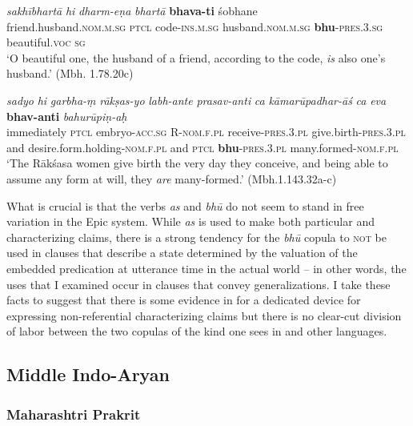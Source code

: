 \documentclass[output=paper,hidelinks]{langscibook}
\begin{document}
\begin{exe}
\begin{xlist}
\begin{xlist}
\begin{exe}
\begin{exe}
\begin{exe}
\begin{exe}
\begin{xlist}
\begin{exe}
\begin{xlist}
\ea
\label{bhu1}
\ea
\gll \emph{sakhībhartā} \emph{hi} \emph{dharm-eṇa} \emph{bhartā} \textbf{bhava-ti} {\'{s}obhane}\\
 friend.husband.\textsc{nom.m.sg} \textsc{ptcl} code-\textsc{ins.m.sg} husband.\textsc{nom.m.sg} \textbf{bhu}-\textsc{pres.3.sg} beautiful.\textsc{voc sg}\\
\glt `O beautiful one, the husband of a friend, according to the code, \emph{is} also one's husband.' (Mbh. 1.78.20c) \label{husband}

\ex
\gll \emph{sadyo} \emph{hi} \emph{garbha-\d{m}} \emph{rāk\d{s}as-yo} \emph{labh-ante} \emph{prasav-anti} \emph{ca}
 \emph{kāmar\={u}padhar-ā\'{s}} \emph{ca} \emph{eva} \textbf{bhav-anti} \emph{bahur\={u}piṇ-a\d{h}}\\
immediately \textsc{ptcl} embryo-\textsc{acc.sg} R-\textsc{nom.f.pl} receive-\textsc{pres.3.pl} give.birth-\textsc{pres.3.pl} and desire.form.holding-\textsc{nom.f.pl} and \textsc{ptcl} \textbf{bhu}-\textsc{pres.3.pl} many.formed-\textsc{nom.f.pl}\\
\glt `The Rāk\'{s}asa women give birth the very day they conceive, and being able to assume any form at will, they \emph{are} many-formed.' (Mbh.1.143.32a-c) \label{demon}
\z
\z

What is crucial is that the verbs \emph{as} and \emph{bh\={u}} do not seem to stand in free variation in the Epic  system. While \emph{as} is used to make both particular and characterizing claims, there is a strong tendency for the \emph{bh\={u}} copula to \textsc{not} be used in clauses that describe a state determined by the valuation of the embedded predication at utterance time in the actual world -- in other words, the uses that I examined occur in clauses that convey generalizations. I take these facts to suggest that there is some evidence in  for a dedicated device for expressing non-referential characterizing claims but there is no clear-cut division of labor between the two copulas of the kind one sees in  and other  languages.

\subsection{Middle Indo-Aryan}

\subsubsection{Maharashtri Prakrit}


\end{xlist}
\end{exe}
\end{xlist}
\end{exe}
\end{exe}
\end{exe}
\end{exe}
\end{xlist}
\end{xlist}
\end{exe}
\end{document}
